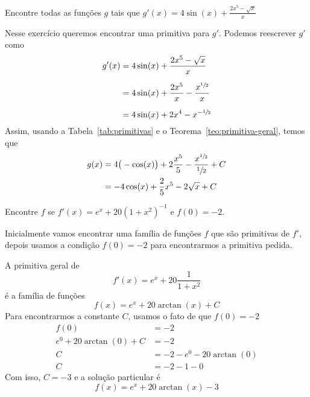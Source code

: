 \begin{example}
  Encontre todas as funções $g$ tais que
  \(
    g'(x)= 4 \sin(x)+ \frac{2x^5- \sqrt{x}}{x}
  \)

  \solution
  Nesse exercício queremos encontrar uma primitiva para $g'$.
  Podemos reescrever $g'$ como
  \begin{align*}
    g'(x)
    & = 4 \sin(x) + \frac{2x^5- \sqrt{x}}{x} \\[2mm]
    & = 4 \sin(x) + \frac{2x^5}{x} - \frac{x^{\sfrac{1}{2}}}{x} \\[2mm]
    & = 4 \sin(x) + 2x^4 -x^{-\sfrac{1}{2}}
  \end{align*}
  Assim, usando a Tabela~\ref{tab:primitivas} e o
  Teorema~\ref{teo:primitiva-geral}, temos que
  \begin{align*}
    g(x)
    & = 4\big(-\cos(x)\big)
      + 2 \frac{x^5}{5}
      - \frac{x^{\sfrac{1}{2}}}{\sfrac{1}{2}}
      + C \\
    & = -4 \cos(x) + \frac{2}{5}x^5 - 2 \sqrt{x} + C
  \end{align*}
\end{example}

\begin{example}
  Encontre $f$ se $f'(x)= e^x+20(1+x^2)^{-1}$ e $f(0)=-2$.

  \solution
  Inicialmente vamos encontrar uma família de funções $f$ que são primitivas de
  $f'$, depois usamos a condição $f(0)=-2$ para encontrarmos a primitiva
  pedida.

  A primitiva geral de
  \[
    f'(x)= e^x + 20\frac{1}{1+x^2}
  \]
  é a família de funções
  \[
    f(x) = e^x + 20\arctan(x) + C
  \]
  Para encontrarmos a constante $C$, usamos o fato de que $f(0)=-2$
  \begin{align*}
    f(0) & = -2 \\
    e^0 + 20 \arctan(0) + C & = -2 \\
    C & = -2 - e^0 - 20 \arctan(0) \\
    C & = -2 - 1 - 0
  \end{align*}
  Com isso, $C=-3$ e a solução particular é
  \[
    f(x) = e^x + 20 \arctan(x) -3
  \]
\end{example}

